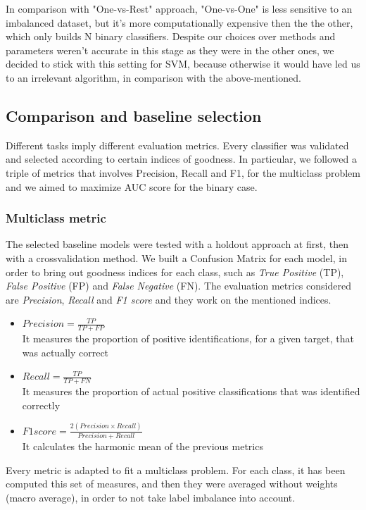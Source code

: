 In comparison with "One-vs-Rest" approach, "One-vs-One" is less sensitive to an imbalanced dataset, but it's more computationally expensive then the the other, which only builds N binary classifiers.
Despite our choices over methods and parameters weren't accurate in this stage as they were in the other ones, we decided to stick with this setting for SVM, because otherwise it would have led us to an irrelevant algorithm, in comparison with the above-mentioned.

\subsection{Comparison and baseline selection}
Different tasks imply different evaluation metrics. Every classifier was validated and selected according to certain indices of goodness. In particular, we followed a triple of metrics that involves Precision, Recall and F1, for the multiclass problem and we aimed to maximize AUC score for the binary case.
\subsubsection{Multiclass metric}
The selected baseline models were tested with a holdout approach at first, then with a crossvalidation method.
We built a Confusion Matrix for each model, in order to bring out goodness indices for each class, such as \textit{True Positive} (TP), \textit{False Positive} (FP) and \textit{False Negative} (FN).
The evaluation metrics considered are \textit{Precision}, \textit{Recall} and \textit{F1 score} and they work on the mentioned indices.
\begin{itemize}
	\item[\PencilRight] $ Precision = \frac{TP}{TP+FP} $\\
	It measures the proportion of positive identifications, for a given target, that was actually correct
	\item[\PencilRight] $ Recall = \frac{TP}{TP+FN} $\\
	It measures the proportion of actual positive classifications that was identified correctly
	\item[\PencilRight] $ F1 score = \frac{2(Precision \times Recall )}{Precision+Recall} $\\
	It calculates the harmonic mean of the previous metrics
\end{itemize}
Every metric is adapted to fit a multiclass problem. For each class, it has been computed this set of measures, and then they were averaged without weights (macro average), in order to not take label imbalance into account.


